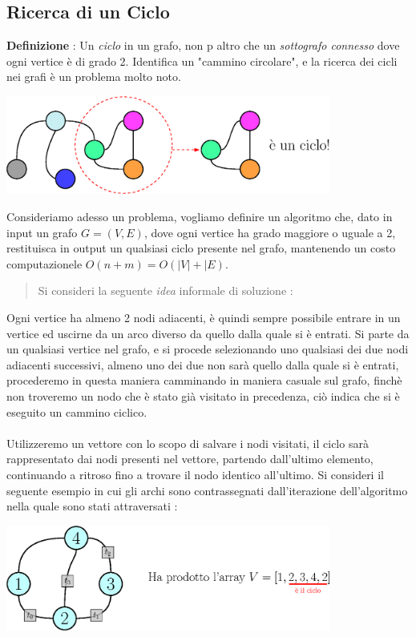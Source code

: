 \documentclass[12pt, letterpaper]{article}
\newcommand{\acc}{\\\hphantom{}\\}
\begin{document}
\subsection{Ricerca di un Ciclo}
\textbf{Definizione} : Un \textit{ciclo} in un grafo, non p altro che un \textit{sottografo connesso} dove 
ogni vertice è di grado 2. Identifica un "cammino circolare", e la ricerca dei cicli nei grafi è un 
problema molto noto.\begin{center}
    \includegraphics[width=0.8\textwidth ]{images/ciclo.eps}
\end{center}
Consideriamo adesso un problema, vogliamo definire un algoritmo che, dato in input un grafo \(G=(V,E)\), dove ogni 
vertice ha grado maggiore o uguale a 2, restituisca in output un qualsiasi ciclo presente nel grafo, mantenendo 
un costo computazionele $O(n+m)=O(|V|+|E)$. 
\begin{quote}
    Si consideri la seguente \textit{idea} informale di soluzione : \end{quote}  
    Ogni vertice ha almeno 2 nodi adiacenti, è quindi sempre possibile entrare in un vertice ed uscirne da un
    arco diverso da quello dalla quale si è entrati. Si parte da un qualsiasi vertice nel grafo, e si procede 
    selezionando uno qualsiasi dei due nodi adiacenti successivi, almeno uno dei due non sarà quello dalla 
    quale si è entrati, procederemo in questa maniera camminando in maniera casuale sul grafo, finchè non troveremo 
    un nodo che è stato già visitato in precedenza, ciò indica che si è eseguito un cammino ciclico.\acc 
Utilizzeremo un vettore con lo scopo di salvare i nodi visitati, il ciclo sarà rappresentato 
dai nodi presenti nel vettore, partendo dall'ultimo elemento, continuando a ritroso fino a trovare il nodo 
identico all'ultimo. Si consideri il seguente esempio in cui gli archi sono contrassegnati dall'iterazione 
dell'algoritmo nella quale sono stati attraversati : 
\begin{center}
    \includegraphics[width=0.8\textwidth ]{images/algoCiclo.eps}
\end{center}
\end{document}
